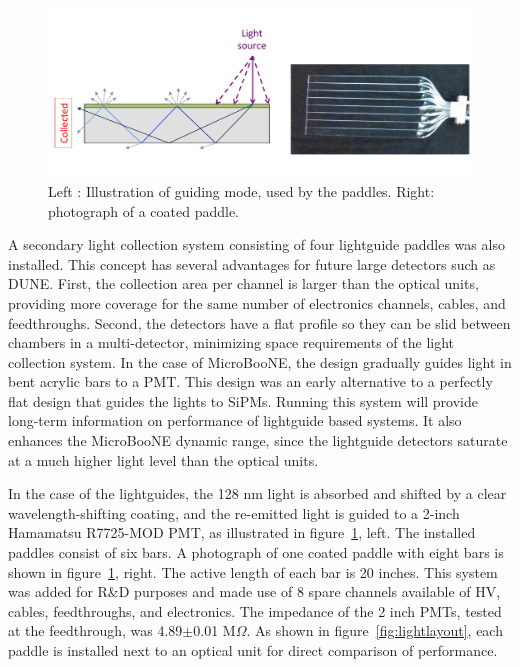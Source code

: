 \begin{figure}[t]
\centering 
\includegraphics[width=\textwidth]{./light_figures/LightguideModeAndPhoto.pdf}
\caption{Left : Illustration of guiding mode, used by the paddles. Right: photograph of a coated paddle. \label{fig:LGCoating}}
\end{figure}


A secondary light collection system consisting of four lightguide paddles was also installed.   This concept has several advantages for future large detectors such as DUNE. First, the collection area per channel is larger than the optical units, providing more coverage for the same number of electronics channels, cables, and feedthroughs.  Second, the detectors have a flat profile so they can be slid between chambers in a multi-\lartpc detector, minimizing space requirements of the light collection system.  In the case of MicroBooNE, the design gradually guides light in bent acrylic bars to a PMT.  This design was an early alternative to a perfectly flat design that guides the lights to SiPMs.  Running this system will provide long-term information on performance of lightguide based systems.  It also enhances the MicroBooNE dynamic range, since the lightguide detectors saturate at a much higher light level than the optical units.

In the case of the lightguides, the 128 nm light is absorbed and shifted by a clear wavelength-shifting coating, and the re-emitted light is guided to a 2-inch Hamamatsu R7725-MOD PMT, as illustrated in figure~\ref{fig:LGCoating}, left. The installed paddles consist of six bars.  A photograph of one coated paddle with eight bars is shown in figure~\ref{fig:LGCoating}, right.  The active length of each bar is 20 inches.  This system was added for R\&D purposes and made use of 8 spare channels available of HV, cables, feedthroughs, and electronics.  The impedance of the 2 inch PMTs, tested at the feedthrough, was 4.89$\pm$0.01 M$\Omega$.  As shown in figure~\ref{fig:lightlayout}, each paddle is installed next to an optical unit for direct comparison of performance.

